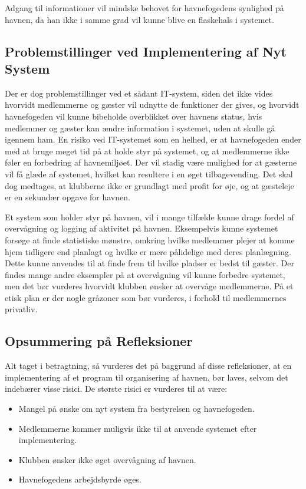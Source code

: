 Adgang til informationer vil mindske behovet for havnefogedens synlighed på havnen, da han ikke i samme grad vil kunne blive en flaskehals i systemet.

\subsection{Problemstillinger ved Implementering af Nyt System}\label{sub:etik}

Der er dog problemstillinger ved et sådant IT-system, siden det ikke vides hvorvidt medlemmerne og gæster vil udnytte de funktioner der gives, og hvorvidt havnefogeden vil kunne bibeholde overblikket over havnens status, hvis medlemmer og gæster kan ændre information i systemet, uden at skulle gå igennem ham. En risiko ved IT-systemet som en helhed, er at havnefogeden ender med at bruge meget tid på at holde styr på systemet, og at medlemmerne ikke føler en forbedring af havnemiljøet. Der vil stadig være mulighed for at gæsterne vil få glæde af systemet, hvilket kan resultere i en øget tilbagevending. Det skal dog medtages, at klubberne ikke er grundlagt med profit for øje, og at gæsteleje er en sekundær opgave for havnen.

Et system som holder styr på havnen, vil i mange tilfælde kunne drage fordel af overvågning og logging af aktivitet på havnen. Eksempelvis kunne systemet forsøge at finde statistiske mønstre, omkring hvilke medlemmer plejer at komme hjem tidligere end planlagt og hvilke er mere pålidelige med deres planlægning. Dette kunne anvendes til at finde frem til hvilke pladser er bedst til gæster. Der findes mange andre eksempler på at overvågning vil kunne forbedre systemet, men det bør vurderes hvorvidt klubben ønsker at overvåge medlemmerne. På et etisk plan er der nogle gråzoner som bør vurderes, i forhold til medlemmernes privatliv.

\subsection{Opsummering på Refleksioner}

Alt taget i betragtning, så vurderes det på baggrund af disse refleksioner, at en implementering af et program til organisering af havnen, bør laves, selvom det indebærer visse risici. De største risici er vurderes til at være:

\begin{itemize}
  \item Mangel på ønske om nyt system fra bestyrelsen og havnefogeden.
  \item Medlemmerne kommer muligvis ikke til at anvende systemet efter implementering.
  \item Klubben ønsker ikke øget overvågning af havnen.
  \item Havnefogedens arbejdsbyrde øges.
\end{itemize}

